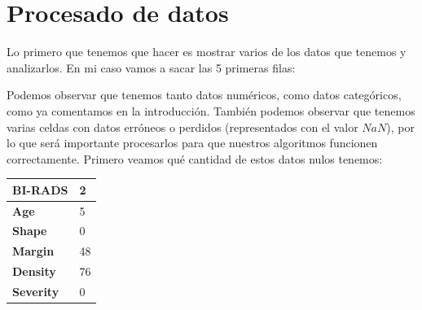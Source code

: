 \documentclass[11pt,a4paper]{article}
\begin{document}
\newpage

\section{Procesado de datos}

Lo primero que tenemos que hacer es mostrar varios de los datos que tenemos y analizarlos. En mi caso vamos a sacar las 5 primeras
filas:

\begin{table}[H]
    \centering
\end{table}

Podemos observar que tenemos tanto datos numéricos, como datos categóricos, como ya comentamos en la introducción. También podemos
observar que tenemos varias celdas con datos erróneos o perdidos (representados con el valor $NaN$), por lo que será importante
procesarlos para que nuestros algoritmos funcionen correctamente. Primero veamos qué cantidad de estos datos nulos tenemos:

\begin{table}[H]
    \centering
    \begin{tabular}{|l|l|}
    \hline
    \multicolumn{1}{|c|}{\textbf{BI-RADS}} & 2 \\ \hline
    \textbf{Age} & 5 \\ \hline
    \textbf{Shape} & 0 \\ \hline
    \textbf{Margin} & 48 \\ \hline
    \textbf{Density} & 76 \\ \hline
    \textbf{Severity} & 0 \\ \hline
    \end{tabular}
\end{table}
\end{document}
